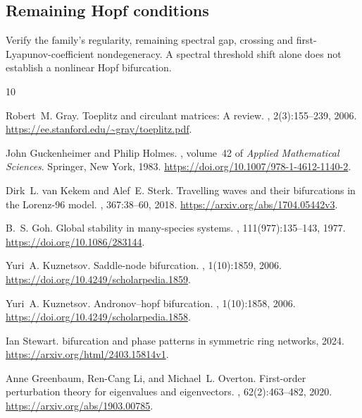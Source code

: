 \documentclass[11pt]{article}
\theoremstyle{definition}
\theoremstyle{remark}
\begin{document}
\subsection{Remaining Hopf conditions}\label{slot:P18-4}
Verify the family's regularity, remaining spectral gap, crossing and
first-Lyapunov-coefficient nondegeneracy. A spectral threshold shift alone
does not establish a nonlinear Hopf bifurcation.


\clearpage
\begin{thebibliography}{10}

Robert~M. Gray.
\newblock Toeplitz and circulant matrices: A review.
, 2(3):155--239, 2006.
\newblock \url{https://ee.stanford.edu/~gray/toeplitz.pdf}.

John Guckenheimer and Philip Holmes.
, volume~42 of {\em Applied Mathematical Sciences}.
\newblock Springer, New York, 1983.
\newblock \url{https://doi.org/10.1007/978-1-4612-1140-2}.

Dirk~L. van Kekem and Alef~E. Sterk.
\newblock Travelling waves and their bifurcations in the {Lorenz-96} model.
, 367:38--60, 2018.
\newblock \url{https://arxiv.org/abs/1704.05442v3}.

B.~S. Goh.
\newblock Global stability in many-species systems.
, 111(977):135--143, 1977.
\newblock \url{https://doi.org/10.1086/283144}.

Yuri~A. Kuznetsov.
\newblock Saddle-node bifurcation.
, 1(10):1859, 2006.
\newblock \url{https://doi.org/10.4249/scholarpedia.1859}.

Yuri~A. Kuznetsov.
\newblock Andronov--hopf bifurcation.
, 1(10):1858, 2006.
\newblock \url{https://doi.org/10.4249/scholarpedia.1858}.

Ian Stewart.
 bifurcation and phase patterns in symmetric ring networks,
  2024.
\newblock \url{https://arxiv.org/html/2403.15814v1}.

Anne Greenbaum, Ren-Cang Li, and Michael~L. Overton.
\newblock First-order perturbation theory for eigenvalues and eigenvectors.
, 62(2):463--482, 2020.
\newblock \url{https://arxiv.org/abs/1903.00785}.


\end{thebibliography}
\end{document}
